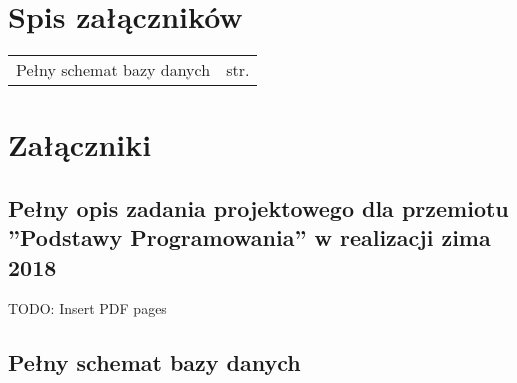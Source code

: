 \chapter*{Spis załączników}
\noindent

\begin{tabularx}{\textwidth}{Xl}

    Pełny schemat bazy danych & str. \pageref{file:database-schema} \\

\end{tabularx}

\chapter*{Załączniki}

\section{Pełny opis zadania projektowego dla przemiotu ”Podstawy Programowania” w realizacji zima 2018}
\label{file:penguins_description}

{
TODO: Insert PDF pages
}


\section*{Pełny schemat bazy danych}
\label{file:database-schema}
{
\scriptsize

}


\clearpage
